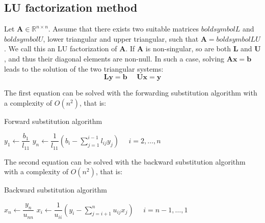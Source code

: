 \documentclass[12pt, a4paper]{report}
\begin{document}
    \subsection{LU factorization method}
    Let $\boldsymbol{A} \in \mathbb{R}^{n \times n}$. Assume that there exists two suitable matrices $boldsymbol{L}$ and $boldsymbol{U}$, 
    lower triangular and upper triangular, such that $\boldsymbol{A}=boldsymbol{LU}$. We call this an LU factorization of $\boldsymbol{A}$. 
    If $\boldsymbol{A}$ is non-singular, so are both $\boldsymbol{L}$ and $\boldsymbol{U}$, and thus their diagonal elements are non-null. 
    In such a case, solving $\boldsymbol{Ax}=\boldsymbol{b}$ leads to the solution of the two triangular systems:
    \[\boldsymbol{Ly}=\boldsymbol{b}\:\:\:\:\:\:\boldsymbol{Ux}=\boldsymbol{y}\]
    
    The first equation can be solved with the forwarding substitution algorithm with a complexity of $O(n^2)$, that is: 
    \begin{algorithm}[H]
        \caption{Forward substitution algorithm}
            \begin{algorithmic}
                \State $y_1\leftarrow\dfrac{b_1}{l_{11}}$
                \State $y_n\leftarrow\dfrac{1}{l_{11}}\left( b_i-\sum_{j=1}^{i-1}{l_{ij}y_j} \right) \:\:\:\:\:\: i=2,\dots,n$
            \end{algorithmic}
    \end{algorithm}

    The second equation can be solved with the backward substitution algorithm with a complexity of $O(n^2)$, that is: 
    \begin{algorithm}[H]
        \caption{Backward substitution algorithm}
            \begin{algorithmic}
                \State $x_n\leftarrow\dfrac{y_n}{u_{nn}}$
                \State $x_i\leftarrow\dfrac{1}{u_{ii}} \left( y_i-\sum_{j=i+1}^{n}{u_{ij}x_j} \right) \:\:\:\:\:\: i=n-1,\dots,1$
            \end{algorithmic}
    \end{algorithm}
\end{document}

